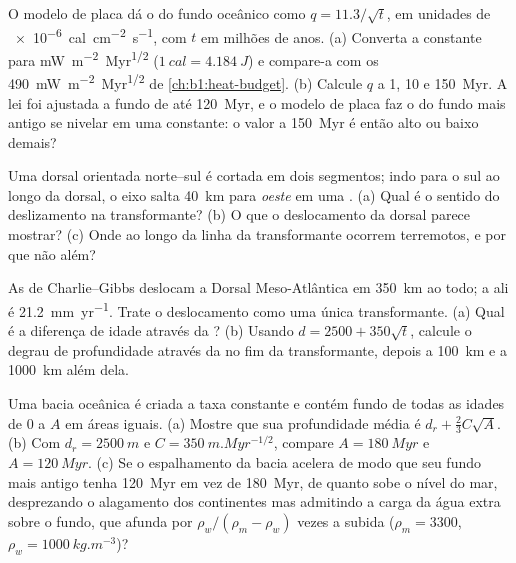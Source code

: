 \begin{exercise}[$\star\star$]\label{exo:b1:rifts-ridges-margins:7}
O modelo de placa dá o  do fundo oceânico como $q = 11.3/\sqrt t$,
em unidades de \qty{e-6}{cal.cm^{-2}.s^{-1}}, com $t$ em milhões de anos.
(a) Converta a constante para \unit{mW.m^{-2}.Myr^{1/2}} ($\qty{1}{cal} =
\qty{4.184}{J}$) e compare-a com os \qty{490}{mW.m^{-2}.Myr^{1/2}} de
\cref{ch:b1:heat-budget}. (b) Calcule $q$ a 1, 10 e \qty{150}{Myr}. A lei foi ajustada a fundo de até \qty{120}{Myr}, e o modelo de placa faz o  do fundo mais antigo se nivelar em uma constante: o valor a \qty{150}{Myr} é então alto ou baixo demais?
\end{exercise}

\begin{exercise}[$\star\star$]\label{exo:b1:rifts-ridges-margins:8}
Uma dorsal orientada norte--sul é cortada em dois segmentos; indo para o sul ao longo
da dorsal, o eixo salta \qty{40}{km} para \emph{oeste} em uma .
(a) Qual é o sentido do deslizamento na transformante? (b) O que o deslocamento
da dorsal parece mostrar? (c) Onde ao longo da linha da transformante ocorrem
terremotos, e por que não além?
\end{exercise}

\begin{exercise}[$\star\star$]\label{exo:b1:rifts-ridges-margins:9}
As  de Charlie--Gibbs deslocam a Dorsal Meso-Atlântica em
\qty{350}{km} ao todo; a  ali é \qty{21.2}{mm.yr^{-1}}.
Trate o deslocamento como uma única transformante. (a) Qual é a diferença de idade
através da ? (b) Usando $d = 2500 + 350\sqrt t$, calcule o degrau de profundidade
através da  no fim da transformante, depois a \qty{100}{km} e a
\qty{1000}{km} além dela.
\end{exercise}

\begin{exercise}[$\star\star\star$]\label{exo:b1:rifts-ridges-margins:10}
Uma bacia oceânica é criada a taxa constante e contém fundo de todas as idades
de 0 a $A$ em áreas iguais. (a) Mostre que sua profundidade média é $d_r +
\frac23C\sqrt A$. (b) Com $d_r = \qty{2500}{m}$ e
$C = \qty{350}{m.Myr^{-1/2}}$, compare $A = \qty{180}{Myr}$ e
$A = \qty{120}{Myr}$. (c) Se o espalhamento da bacia acelera de modo que seu fundo mais antigo
tenha \qty{120}{Myr} em vez de \qty{180}{Myr}, de quanto sobe o nível do mar, desprezando o alagamento dos continentes mas admitindo a carga da água extra sobre o fundo, que afunda
por $\rho_w/(\rho_m - \rho_w)$ vezes a subida ($\rho_m = 3300$, $\rho_w = \qty{1000}{kg.m^{-3}}$)?
\end{exercise}

